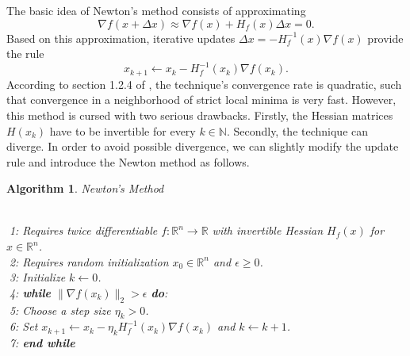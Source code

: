 \documentclass[11pt, a4paper]{article}
\newtheorem{algorithm}[theorem]{Algorithm}
\newcommand{\N}{\mathbb{N}}
\newcommand{\R}{\mathbb{R}}
\begin{document}
The basic idea of Newton's method consists of approximating
\[ \nabla f(x+ \Delta x) \approx \nabla f(x) + H_f(x) \Delta x = 0. \]
Based on this approximation, iterative updates $ \Delta x = - H_f^{-1}(x) \nabla f(x)$ provide the rule
\[ x_{k+1} \leftarrow x_k - H_f^{-1}(x_k) \nabla f(x_k). \]
According to section 1.2.4 of \cite{ConvexOptimization}, the technique's convergence rate is quadratic, such that convergence in a neighborhood of strict local minima is very fast. However, this method is cursed with two serious drawbacks. Firstly, the Hessian matrices $H(x_k)$ have to be invertible for every $k \in \N$. Secondly, the technique can diverge. In order to avoid possible divergence, we can slightly modify the update rule and introduce the Newton method as follows.


\begin{algorithm}
\caption{Newton's Method \textcolor{white}{$\Big |$}} \ \\
\textcolor{white}{$\Big |$}1: Requires twice differentiable $f: \R^n \to \R$ with invertible Hessian $H_f(x)$ for $x \in \R^n$. \\
\textcolor{white}{$\Big |$}2: Requires random initialization $x_0 \in \R^n$ and  $\epsilon \geq 0$. \\
\textcolor{white}{$\Big |$}3: Initialize $k \leftarrow 0$. \\
\textcolor{white}{$\Big |$}4: \textbf{while} $ \big \| \nabla f(x_k) \big \|_2 > \epsilon $ \textbf{do}: \\
\textcolor{white}{$\Big |$}5: \quad Choose a step size $\eta_k > 0$. \\
\textcolor{white}{$\Big |$}6: \quad Set $x_{k+1} \leftarrow x_k - \eta_k H_f^{-1}(x_k) \nabla f(x_k)$ and $k \leftarrow k+1$. \\
\textcolor{white}{$\Big |$}7: \textbf{end while}
\end{algorithm}
\end{document}

